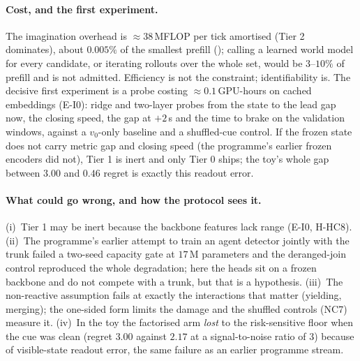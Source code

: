 \paragraph{Cost, and the first experiment.}
The imagination overhead is $\approx38$\,MFLOP per tick amortised (Tier 2 dominates), about $0.005\%$ of the smallest prefill (\evE); calling a learned world model for every candidate, or iterating rollouts over the whole set, would be $3$--$10\%$ of prefill and is not admitted. Efficiency is not the constraint; identifiability is.
The decisive first experiment is a probe costing $\approx0.1$\,GPU-hours on cached embeddings (E-I0): ridge and two-layer probes from the state to the lead gap now, the closing speed, the gap at $+2$\,s and the time to brake on the validation windows, against a $v_0$-only baseline and a shuffled-cue control. If the frozen state does not carry metric gap and closing speed (the programme's earlier frozen encoders did not), Tier 1 is inert and only Tier 0 ships; the toy's whole gap between $3.00$ and $0.46$ regret is exactly this readout error.

\paragraph{What could go wrong, and how the protocol sees it.}
(i)~Tier 1 may be inert because the backbone features lack range (E-I0, H-HC8). (ii)~The programme's earlier attempt to train an agent detector jointly with the trunk failed a two-seed capacity gate at $17$\,M parameters and the deranged-join control reproduced the whole degradation\evI; here the heads sit on a frozen backbone and do not compete with a trunk, but that is a hypothesis. (iii)~The non-reactive assumption fails at exactly the interactions that matter (yielding, merging); the one-sided form limits the damage and the shuffled controls (NC7) measure it. (iv)~In the toy the factorised arm \emph{lost} to the risk-sensitive floor when the cue was clean (regret $3.00$ against $2.17$ at a signal-to-noise ratio of $3$) because of visible-state readout error, the same failure as an earlier programme stream.
